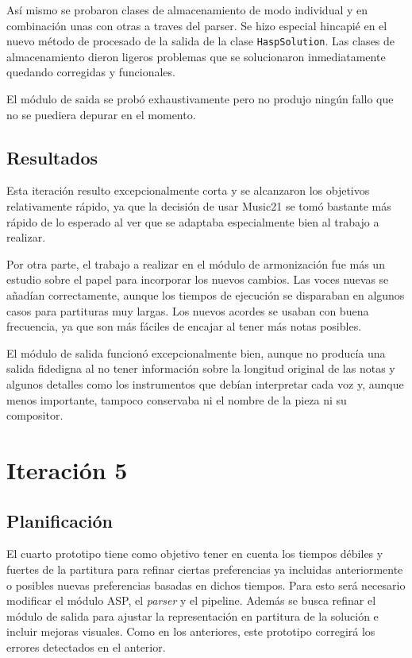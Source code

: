 Así mismo se probaron clases de almacenamiento de modo individual y en combinación unas con otras a traves del parser. Se hizo especial hincapié en el nuevo método de procesado de la salida de la clase \texttt{HaspSolution}. Las clases de almacenamiento dieron ligeros problemas que se solucionaron inmediatamente quedando corregidas y funcionales.

El módulo de saida se probó exhaustivamente pero no produjo ningún fallo que no se puediera depurar en el momento.

\subsection{Resultados}
Esta iteración resulto excepcionalmente corta y se alcanzaron los objetivos relativamente rápido, ya que la decisión de usar Music21 se tomó bastante más rápido de lo esperado al ver que se adaptaba especialmente bien al trabajo a realizar.

Por otra parte, el trabajo a realizar en el módulo de armonización fue más un estudio sobre el papel para incorporar los nuevos cambios. Las voces nuevas se añadían correctamente, aunque los tiempos de ejecución se disparaban en algunos casos para partituras muy largas. Los nuevos acordes se usaban con buena frecuencia, ya que son más fáciles de encajar al tener más notas posibles.

El módulo de salida funcionó excepcionalmente bien, aunque no producía una salida fidedigna al no tener información sobre la longitud original de las notas y algunos detalles como los instrumentos que debían interpretar cada voz y, aunque menos importante, tampoco conservaba ni el nombre de la pieza ni su compositor.

\section{Iteración 5}
\subsection{Planificación}
El cuarto prototipo tiene como objetivo tener en cuenta los tiempos débiles y fuertes de la partitura para refinar ciertas preferencias ya incluidas anteriormente o posibles nuevas preferencias basadas en dichos tiempos. Para esto será necesario modificar el módulo ASP, el \textit{parser} y el pipeline. Además se busca refinar el módulo de salida para ajustar la representación en partitura de la solución e incluir mejoras visuales. Como en los anteriores, este prototipo corregirá los errores detectados en el anterior.

